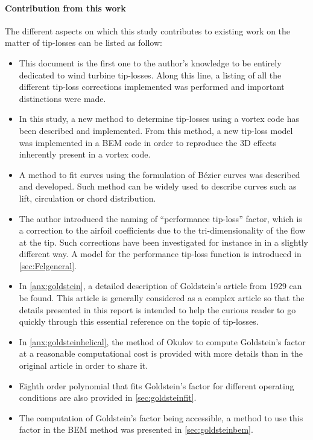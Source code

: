 \documentclass[a4paper,11pt]{book}
\begin{document}
\paragraph{Contribution from this work} The different aspects on which this study contributes to existing work on the matter of tip-losses can be listed as follow:
\begin{itemize}
    \item This document is the first one to the author's knowledge to be entirely dedicated to wind turbine tip-losses. Along this line, a listing of all the different tip-loss corrections implemented was performed and important distinctions were made.  
    \item In this study, a new method to determine tip-losses using a vortex code has been described and implemented. From this method, a new tip-loss model was implemented in a BEM code in order to reproduce the 3D effects inherently present in a vortex code.
    \item A method to fit curves using the formulation of B\'ezier curves was described and developed. Such method can be widely used to describe curves such as lift, circulation or chord distribution.
    \item The author introduced the naming of ``performance tip-loss'' factor, which is a correction to the airfoil coefficients due to the tri-dimensionality of the flow at the tip. Such corrections have been investigated for instance in \cite{shen:2005} in a slightly different way. A model for the performance tip-loss function is introduced in \autoref{sec:Fclgeneral}.
    \item In \autoref{anx:goldstein}, a detailed description of Goldstein's article from 1929\cite{goldstein:1929} can be found. This article is generally considered as a complex article so that the details presented in this report is intended to help the curious reader to go quickly through this essential reference on the topic of tip-losses.
    \item In \autoref{anx:goldsteinhelical}, the method of Okulov\cite{okulov:2007} to compute Goldstein's factor at a reasonable computational cost is provided with more details than in the original article in order to share it.
    \item Eighth order polynomial that fits Goldstein's factor for different operating conditions are also provided in \autoref{sec:goldsteinfit}.
    \item The computation of Goldstein's factor being accessible, a method to use this factor in the BEM method was presented in \autoref{sec:goldsteinbem}.

\end{itemize}
\end{document}

